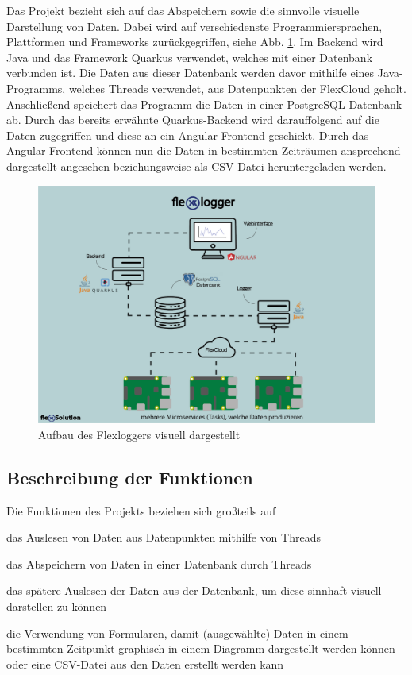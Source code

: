 Das Projekt bezieht sich auf das Abspeichern sowie die sinnvolle visuelle Darstellung von Daten. Dabei wird auf verschiedenste Programmiersprachen, Plattformen und Frameworks zurückgegriffen, siehe Abb. \ref{fig:impl:FlexLoggerAufbau}.
Im Backend wird Java und das Framework Quarkus verwendet, welches mit einer Datenbank verbunden ist. Die Daten aus dieser Datenbank werden davor mithilfe eines Java-Programms, welches Threads verwendet, aus Datenpunkten der FlexCloud geholt. Anschließend speichert das Programm die Daten in einer PostgreSQL-Datenbank ab. Durch das bereits erwähnte Quarkus-Backend wird darauffolgend auf die Daten zugegriffen und diese an ein Angular-Frontend geschickt. Durch das Angular-Frontend können nun die Daten in bestimmten Zeiträumen ansprechend dargestellt angesehen beziehungsweise als CSV-Datei heruntergeladen werden.


\begin{figure}
\centering
\includegraphics[scale=0.7]{pics/webinertface3.png}
\caption{Aufbau des Flexloggers visuell dargestellt}
\label{fig:impl:FlexLoggerAufbau}
\end{figure}


\subsection{Beschreibung der Funktionen}
Die Funktionen des Projekts beziehen sich großteils auf
\begin{compactitem}
\item das Auslesen von Daten aus Datenpunkten mithilfe von Threads
\item das Abspeichern von Daten in einer Datenbank durch Threads
\item das spätere Auslesen der Daten aus der Datenbank, um diese sinnhaft visuell darstellen zu können
\item die Verwendung von Formularen, damit (ausgewählte) Daten in einem bestimmten Zeitpunkt graphisch in einem Diagramm dargestellt werden können oder eine CSV-Datei aus den Daten erstellt werden kann
\end{compactitem}



